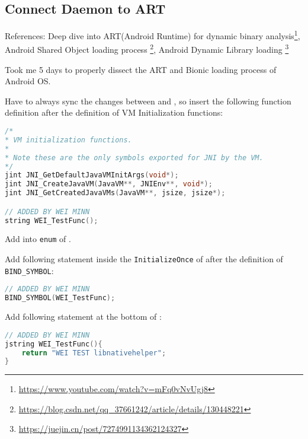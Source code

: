 \subsection{Connect Daemon to ART}
\label{task:20230101_aosp}

References: Deep dive into ART(Android Runtime) for dynamic binary analysis\footnote{\url{https://www.youtube.com/watch?v=mFq0vNvUgj8}}, Android Shared Object loading process \footnote{\url{https://blog.csdn.net/qq_37661242/article/details/130448221}}, Android Dynamic Library loading \footnote{\url{https://juejin.cn/post/7274991134362124327}}

Took me 5 days to properly dissect the ART and Bionic loading process of Android OS.



Have to always sync the changes between  and , so insert the following function definition after the definition of VM Initialization functions: 
\begin{lstlisting}[language=C++]
/*
* VM initialization functions.
*
* Note these are the only symbols exported for JNI by the VM.
*/
jint JNI_GetDefaultJavaVMInitArgs(void*);
jint JNI_CreateJavaVM(JavaVM**, JNIEnv**, void*);
jint JNI_GetCreatedJavaVMs(JavaVM**, jsize, jsize*);

// ADDED BY WEI MINN
string WEI_TestFunc();
\end{lstlisting}

Add  into  \texttt{enum} of .

Add following statement inside the \texttt{InitializeOnce} of  after the definition of \texttt{BIND\_SYMBOL}: 
\begin{lstlisting}[language=C++]
// ADDED BY WEI MINN
BIND_SYMBOL(WEI_TestFunc);
\end{lstlisting}

Add following statement at the bottom of : 
\begin{lstlisting}[language=C++]
// ADDED BY WEI MINN
jstring WEI_TestFunc(){
    return "WEI TEST libnativehelper";
}
\end{lstlisting}

